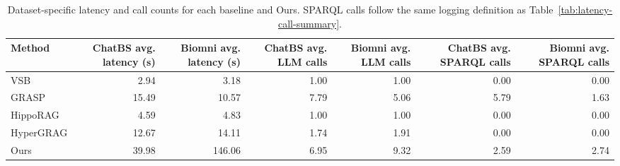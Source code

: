 \begin{table}[t]
\centering
\caption{Dataset-specific latency and call counts for each baseline and Ours. SPARQL calls follow the same logging definition as Table~\ref{tab:latency-call-summary}.}
\label{tab:latency-call-summary-by-dataset}
\scriptsize
\begin{tabular}{lrrrrrr}
\toprule
Method & ChatBS avg. latency (s) & Biomni avg. latency (s) & ChatBS avg. LLM calls & Biomni avg. LLM calls & ChatBS avg. SPARQL calls & Biomni avg. SPARQL calls \\
\midrule
VSB & 2.94 & 3.18 & 1.00 & 1.00 & 0.00 & 0.00 \\
GRASP & 15.49 & 10.57 & 7.79 & 5.06 & 5.79 & 1.63 \\
HippoRAG & 4.59 & 4.83 & 1.00 & 1.00 & 0.00 & 0.00 \\
HyperGRAG & 12.67 & 14.11 & 1.74 & 1.91 & 0.00 & 0.00 \\
Ours & 39.98 & 146.06 & 6.95 & 9.32 & 2.59 & 2.74 \\
\bottomrule
\end{tabular}
\end{table}

